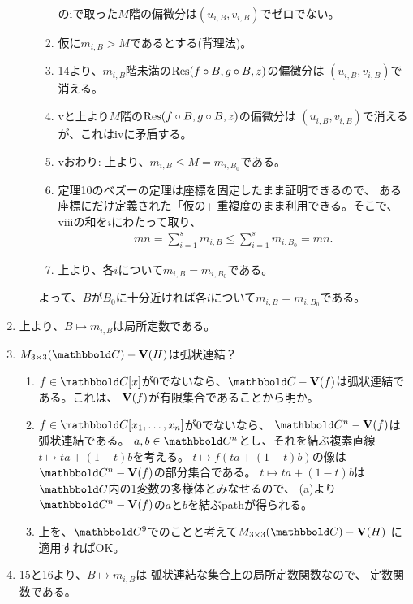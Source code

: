 \begin{myproof}
\begin{enumerate}
\begin{enumerate}
\begin{enumerate}
        のiで取った$M$階の偏微分は$(u_{i,B},v_{i,B})$でゼロでない。
        \item
        仮に$m_{i,B} > M$であるとする(背理法)。
        \item
        14より、$m_{i,B}$階未満の$\mathrm{Res}(f\circ B, g\circ B, z)$の偏微分は
        $(u_{i,B},v_{i,B})$で消える。
        \item
        vと上より$M$階の$\mathrm{Res}(f\circ B, g\circ B, z)$の偏微分は
        $(u_{i,B},v_{i,B})$で消えるが、これはivに矛盾する。
        \item
        vおわり: 上より、$m_{i,B}\le M = m_{i,B_0}$である。
        \item
        定理10のベズーの定理は座標を固定したまま証明できるので、
        ある座標にだけ定義された「仮の」重複度のまま利用できる。そこで、
        viiiの和を$i$にわたって取り、
        \begin{align}
          mn = \sum_{i=1}^s m_{i,B} \le \sum_{i=1}^s m_{i,B_0} = mn.
        \end{align}
        \item
        上より、各$i$について$m_{i,B} = m_{i,B_0}$である。
      \end{enumerate}
      よって、$B$が$B_0$に十分近ければ各$i$について$m_{i,B} = m_{i,B_0}$である。
    \end{enumerate}
    \item
    上より、$B\mapsto m_{i,B}$は局所定数である。
    \item
    $M_{3\times 3}(\C)-\var(H)$は弧状連結？
    \begin{enumerate}
      \item $f\in \C[x]$が0でないなら、$\C-\var(f)$は弧状連結である。これは、
      $\textbf V(f)$が有限集合であることから明か。
      \item $f\in \C[x_1,\dots,x_n]$が0でないなら、
      $\C^n - \var(f)$は弧状連結である。
      $a,b\in \C^n$とし、それを結ぶ複素直線$t\mapsto ta + (1-t)b$を考える。
      $t\mapsto f(ta+(1-t)b)$の像は$\C^n - \var(f)$の部分集合である。
      $t\mapsto ta+(1-t)b$は$\C$内の1変数の多様体とみなせるので、
      (a)より$\C^n - \var(f)$の$a$と$b$を結ぶpathが得られる。
      \item 上を、$\C^9$でのことと考えて$M_{3\times 3}(\C) - \var(H)$
      に適用すればOK。
    \end{enumerate}
    \item
    15と16より、$B\mapsto m_{i,B}$は
    弧状連結な集合上の局所定数関数なので、
    定数関数である。
  \end{enumerate}
\end{myproof}
